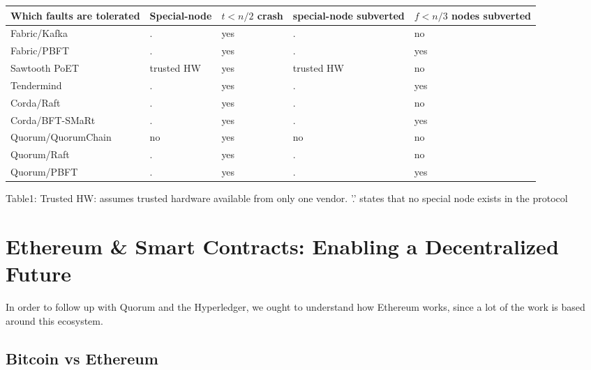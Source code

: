 \documentclass{article}
\begin{document}
\begin{center}
\begin{tabular}{ | m{4cm} | m{2cm}| m{2cm} | m{2cm} | m{2cm} | } 
\hline
Which faults are tolerated & Special-node & $t<n/2$ crash & special-node subverted & $f<n/3$ nodes subverted \\ 
\hline
Fabric/Kafka & . & yes & . & no \\ 
\hline
Fabric/PBFT & . & yes & . & yes \\ 
\hline

Sawtooth PoET & trusted HW & yes & trusted HW & no \\ 
\hline


Tendermind & . & yes & . & yes \\ 
\hline

Corda/Raft & . & yes & . & no\\ 
\hline
Corda/BFT-SMaRt & . & yes & . & yes \\ 
\hline

Quorum/QuorumChain & no & yes & no & no \\ 
\hline

Quorum/Raft & . & yes & . & no \\ 
\hline

Quorum/PBFT & . & yes & . & yes \\ 
\hline


\end{tabular}
\end{center}

Table1: Trusted HW: assumes trusted hardware available from only one vendor. '.' states that no special node exists in the protocol


\section {Ethereum & Smart Contracts: Enabling a Decentralized Future}

In order to follow up with Quorum and the Hyperledger, we ought to understand how Ethereum works, since a lot of the work is based around this ecosystem.

\subsection{Bitcoin vs Ethereum}
\end{document}

